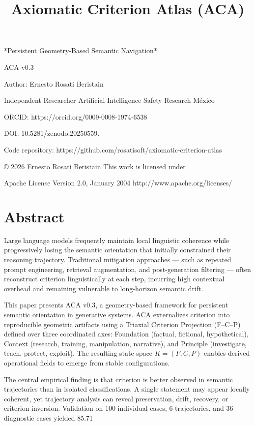 \documentclass[11pt]{article}
\begin{document}
\title{Axiomatic Criterion Atlas (ACA)}
\maketitle

*Persistent Geometry-Based Semantic Navigation*

ACA v0.3

Author: Ernesto Rosati Beristain

Independent Researcher Artificial Intelligence Safety Research México

ORCID: https://orcid.org/0009-0008-1974-6538

DOI: 10.5281/zenodo.20250559.

Code repository: https://github.com/rosatisoft/axiomatic-criterion-atlas

© 2026 Ernesto Rosati Beristain This work is licensed under

Apache License Version 2.0, January 2004 http://www.apache.org/licenses/

\section{Abstract}

Large language models frequently maintain local linguistic coherence while progressively losing the semantic orientation that initially constrained their reasoning trajectory. Traditional mitigation approaches — such as repeated prompt engineering, retrieval augmentation, and post-generation filtering — often reconstruct criterion linguistically at each step, incurring high contextual overhead and remaining vulnerable to long-horizon semantic drift.

This paper presents ACA v0.3, a geometry-based framework for persistent semantic orientation in generative systems. ACA externalizes criterion into reproducible geometric artifacts using a Triaxial Criterion Projection (F–C–P) defined over three coordinated axes: Foundation (factual, fictional, hypothetical), Context (research, training, manipulation, narrative), and Principle (investigate, teach, protect, exploit). The resulting state space $ K = (F, C, P) $ enables derived operational fields to emerge from stable configurations.

The central empirical finding is that criterion is better observed in semantic trajectories than in isolated classifications. A single statement may appear locally coherent, yet trajectory analysis can reveal preservation, drift, recovery, or criterion inversion. Validation on 100 individual cases, 6 trajectories, and 36 diagnostic cases yielded 85.71%
\end{document}
